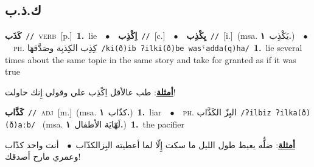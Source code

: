 \documentclass[10pt,a4paper,twoside]{article} %
\begin{document}
\begin{multicols}{2}
\vspace{-3mm}
\subsection*{\color{blue}\foreignlanguage{arabic}{ك.ذ.ب}\color{blue}{}} 

{\setlength\topsep{0pt}\textbf{\foreignlanguage{arabic}{كَذَب}}\ {\color{gray}\texttt{//}\color{black}}\ \textsc{verb}\ [p.]\ \textbf{1.}~lie\ \ $\bullet$\ \ \setlength\topsep{0pt}\textbf{\foreignlanguage{arabic}{اِكْذِب}}\ {\color{gray}\texttt{//}\color{black}}\ [c.]\ \ $\bullet$\ \ \setlength\topsep{0pt}\textbf{\foreignlanguage{arabic}{يِكْذِب}}\ {\color{gray}\texttt{//}\color{black}}\ [i.]\ \color{gray}(msa. \foreignlanguage{arabic}{يَكْذِب}~\foreignlanguage{arabic}{\textbf{١.}})\color{black}\ \ $\bullet$\ \ \textsc{ph.} \color{gray} \foreignlanguage{arabic}{كِذِب الكِذبِة وصَدَّقهَا}\color{black}\ {\color{gray}\texttt{/{\sffamily ki(ð)ib ʔilki(ð)be wasˤadda(q)ha}/}\color{black}}\ \textbf{1.}~lie several times about the same topic in the same story and take for granted as if it was true\  \begin{flushright}\color{gray}\foreignlanguage{arabic}{\textbf{\underline{\foreignlanguage{arabic}{أمثلة}}}: طب عالأقل اِكْذِب علي وقولي إِنك حاولت!}\end{flushright}\color{black}} \vspace{2mm}

{\setlength\topsep{0pt}\textbf{\foreignlanguage{arabic}{كَذَّاب}}\ {\color{gray}\texttt{//}\color{black}}\ \textsc{adj}\ [m.]\ \color{gray}(msa. \foreignlanguage{arabic}{كذّاب}~\foreignlanguage{arabic}{\textbf{١.}})\color{black}\ \textbf{1.}~liar\ \ $\bullet$\ \ \textsc{ph.} \color{gray} \foreignlanguage{arabic}{البِزّ الكَذَّاب}\color{black}\ {\color{gray}\texttt{/{\sffamily ʔilbiz ʔilka(ð)(ð)aːb}/}\color{black}}\ \color{gray} (msa. \foreignlanguage{arabic}{لَهّايَة الأطفال}~\foreignlanguage{arabic}{\textbf{١.}})\color{black}\ \textbf{1.}~the pacifier\  \begin{flushright}\color{gray}\foreignlanguage{arabic}{\textbf{\underline{\foreignlanguage{arabic}{أمثلة}}}: ضلُّه يعيط طول الليل ما سكت إِلّا لما أعطيته البِزالكذّاب\ $\bullet$\ \  أنت واحد كذّاب وعمري مارح أصدقك!}\end{flushright}\color{black}} \vspace{2mm}


\end{multicols}
\end{document}
